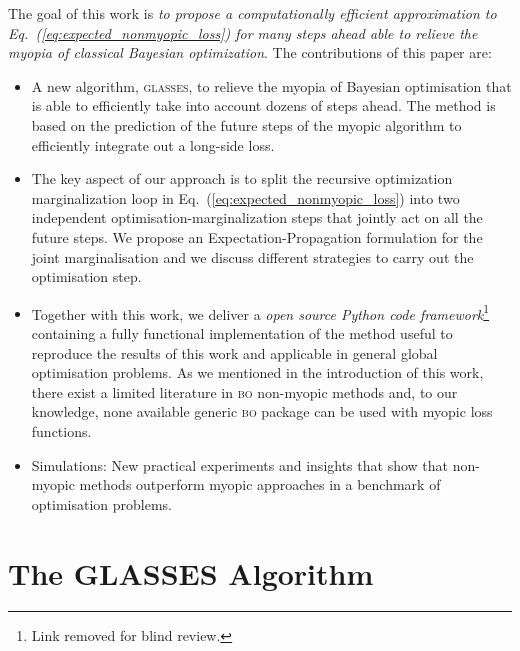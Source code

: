 \documentclass[twoside]{article}
\newcommand{\acr}[1]{\textsc{#1}\xspace}
\newcommand{\us}{\acr{glasses}}
\newcommand{\bo}{\acr{bo}}
\begin{document}
The goal of this work is \emph{to propose a computationally efficient approximation to Eq.~(\ref{eq:expected_nonmyopic_loss}) for many steps ahead able to relieve the myopia of classical Bayesian optimization}. The contributions of this paper are:
\begin{itemize}
\item A new algorithm, \us, to relieve the myopia of Bayesian optimisation that is able to efficiently take into account dozens of steps ahead. The method is based on the prediction of the future steps of the myopic algorithm to efficiently integrate out a long-side loss. 
\item The key aspect of our approach is to split the recursive optimization marginalization loop in Eq.~(\ref{eq:expected_nonmyopic_loss}) into two independent optimisation-marginalization steps that jointly act on all the future steps. We propose an Expectation-Propagation formulation for the joint marginalisation and we discuss different strategies to carry out the optimisation step.
\item Together with this work, we deliver a \emph{open source Python code framework}\footnote{Link removed for blind review.} containing a fully functional  implementation of the method useful to reproduce the results of this work and applicable in general global optimisation problems. As we mentioned in the introduction of this work, there exist a limited literature in \bo non-myopic methods and, to our knowledge, none available generic \bo package can be used with myopic loss functions. 
\item Simulations: New practical experiments and insights that show that non-myopic methods outperform myopic approaches in a benchmark of optimisation problems. 
\end{itemize}



 \section{The GLASSES Algorithm}\label{sec:glasses}
\end{document}
